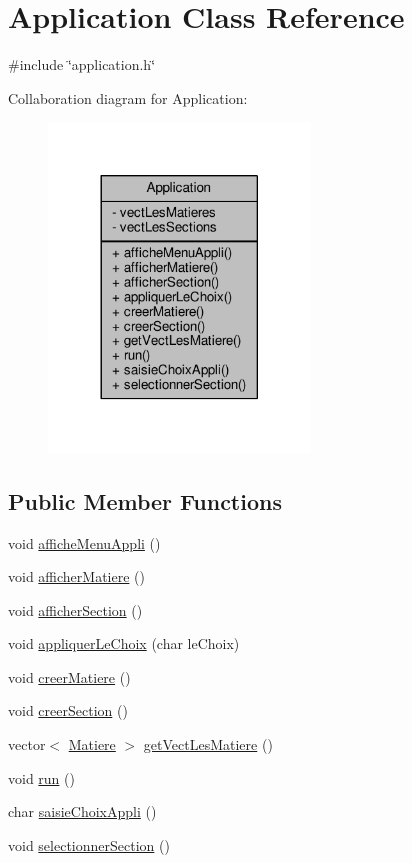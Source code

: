 \hypertarget{classApplication}{\section{Application Class Reference}
\label{classApplication}
}


{\ttfamily \#include \char`\"{}application.\+h\char`\"{}}



Collaboration diagram for Application\+:
\nopagebreak
\begin{figure}[H]
\begin{center}
\leavevmode
\includegraphics[width=197pt]{classApplication__coll__graph}
\end{center}
\end{figure}
\subsection*{Public Member Functions}
\begin{DoxyCompactItemize}
\item 
void \hyperlink{classApplication_a5e251878c195d578410f6eb99d769649}{affiche\+Menu\+Appli} ()
\item 
void \hyperlink{classApplication_a950f9f7e8674d3c1dbd184163f255645}{afficher\+Matiere} ()
\item 
void \hyperlink{classApplication_aedad2e1b155fe604f39325be0923f2e2}{afficher\+Section} ()
\item 
void \hyperlink{classApplication_a94bb92cfb233119d7955ba255a7b8dee}{appliquer\+Le\+Choix} (char le\+Choix)
\item 
void \hyperlink{classApplication_a0e3712f2940cab09560fc250f16e63cc}{creer\+Matiere} ()
\item 
void \hyperlink{classApplication_a060b1b9a54b301c0ef6718410c616044}{creer\+Section} ()
\item 
vector$<$ \hyperlink{classMatiere}{Matiere} $>$ \hyperlink{classApplication_ad4ab0a80cfdc751b3ef0a9c4996af934}{get\+Vect\+Les\+Matiere} ()
\item 
void \hyperlink{classApplication_a13a43e6d814de94978c515cb084873b1}{run} ()
\item 
char \hyperlink{classApplication_a1f818b89f3f965055a688589f67025d4}{saisie\+Choix\+Appli} ()
\item 
void \hyperlink{classApplication_a82148cc49d40d0a6e6baed076f4748de}{selectionner\+Section} ()
\end{DoxyCompactItemize}
